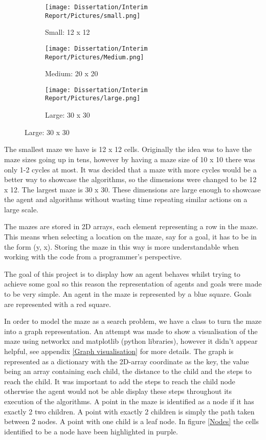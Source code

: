 \documentclass[]{final_report}
\begin{document}
\begin{figure}[h]
     \centering
     \caption{Maze generation}
     \begin{subfigure}[h]{0.3\textwidth}
         \centering
         \texttt{[image: Dissertation/Interim Report/Pictures/small.png]}
         \caption*{Small: 12 x 12}
     \end{subfigure}
     \hfill
     \begin{subfigure}[h]{0.3\textwidth}
         \centering
         \texttt{[image: Dissertation/Interim Report/Pictures/Medium.png]}         \caption*{Medium: 20 x 20}
     \end{subfigure}
     \hfill
     \begin{subfigure}[h]{0.3\textwidth}
         \centering
         \texttt{[image: Dissertation/Interim Report/Pictures/large.png]}
         \caption*{Large: 30 x 30}
     \end{subfigure}
\end{figure}

The smallest maze we have is 12 x 12 cells. Originally the idea was to have the maze sizes going up in tens, however by having a maze size of 10 x 10 there was only 1-2 cycles at most. It was decided that a maze with more cycles would be a better way to showcase the algorithms, so the dimensions were changed to be 12 x 12. The largest maze is 30 x 30. These dimensions are large enough to showcase the agent and algorithms without wasting time repeating similar actions on a large scale.

The mazes are stored in 2D arrays, each element representing a row in the maze. This means when selecting a location on the maze, say for a goal, it has to be in the form (y, x). Storing the maze in this way is more understandable when working with the code from a programmer's perspective.

The goal of this project is to display how an agent behaves whilst trying to achieve some goal so this reason the representation of agents and goals were made to be very simple. An agent in the maze is represented by a blue square. Goals are represented with a red square.

In order to model the maze as a search problem, we have a class to turn the maze into a graph representation. An attempt was made to show a visualisation of the maze using networkx and matplotlib (python libraries), however it didn't appear helpful, see appendix \ref{Graph visualisation} for more details. The graph is represented as a dictionary with the 2D-array coordinate as the key, the value being an array containing each child, the distance to the child and the steps to reach the child. It was important to add the steps to reach the child node otherwise the agent would not be able display these steps throughout its execution of the algorithms. A point in the maze is identified as a node if it has exactly 2 two children. A point with exactly 2 children is simply the path taken between 2 nodes. A point with one child is a leaf node. In figure \ref{Nodes} the cells identified to be a node have been highlighted in purple.
\end{document}
